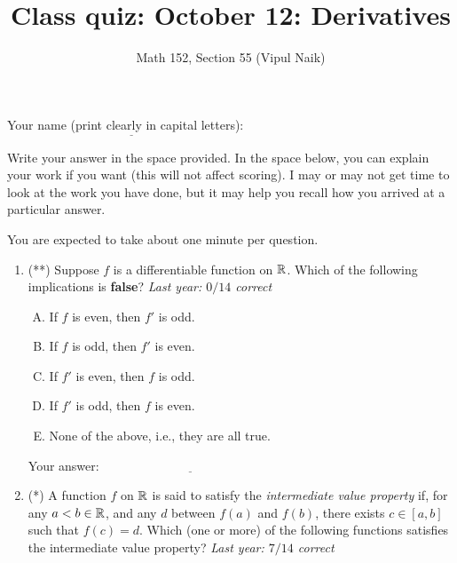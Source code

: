 \documentclass[10pt]{amsart}
\title{Class quiz: October 12: Derivatives}
\author{Math 152, Section 55 (Vipul Naik)}
\begin{document}
\maketitle

Your name (print clearly in capital letters): $\underline{\qquad\qquad\qquad\qquad\qquad\qquad\qquad\qquad\qquad\qquad}$

Write your answer in the space provided. In the space below, you can
explain your work if you want (this will not affect scoring). I may or
may not get time to look at the work you have done, but it may help
you recall how you arrived at a particular answer.

You are expected to take about one minute per question.

\begin{enumerate}

\item (**) Suppose $f$ is a differentiable function on $\mathbb{R}$. Which of the
  following implications is {\bf false}? {\em Last year: $0/14$
  correct}

  \begin{enumerate}[(A)]
  \item If $f$ is even, then $f'$ is odd.
  \item If $f$ is odd, then $f'$ is even.
  \item If $f'$ is even, then $f$ is odd.
  \item If $f'$ is odd, then $f$ is even.
  \item None of the above, i.e., they are all true.
  \end{enumerate}

  \vspace{0.1in}
  Your answer: $\underline{\qquad\qquad\qquad\qquad\qquad\qquad\qquad}$
  \vspace{1.5in}

\item (*) A function $f$ on $\mathbb{R}$ is said to satisfy the {\em intermediate
  value property} if, for any $a < b \in \mathbb{R}$, and any $d$ between
  $f(a)$ and $f(b)$, there exists $c \in [a,b]$ such that $f(c) =
  d$. Which (one or more) of the following functions satisfies the
  intermediate value property? {\em Last year: $7/14$ correct}

  \begin{enumerate}[(A)]


\end{enumerate}
\end{enumerate}
\end{document}

